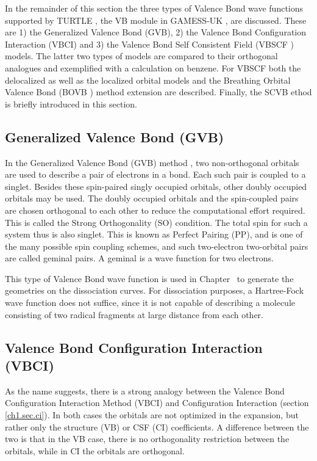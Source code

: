 In the remainder of this section the three types of Valence Bond wave functions supported by TURTLE \cite{turtle}, the VB module in GAMESS-UK \cite{gamess}, are discussed. These are 1) the Generalized Valence Bond (GVB), 2) the Valence Bond Configuration Interaction (VBCI) and 3) the Valence Bond Self Consistent Field (VBSCF \cite{vbscf1,vbscf2}) models. The latter two types of models are compared to their orthogonal analogues and exemplified with a calculation on benzene. For VBSCF both the delocalized as well as the localized orbital models and the Breathing Orbital Valence Bond (BOVB \cite{bovb1,bovb2,bovb3}) method extension are described. Finally, the SCVB ethod \cite{scvb1,scvb2,scvb3} is briefly introduced in this section.

\subsection{Generalized Valence Bond (GVB)}

In the Generalized Valence Bond (GVB) method \cite{jensen,gvb1,gvb2,gvb3,gvb4}, two non-orthogonal orbitals are used to describe a pair of electrons in a bond. Each such pair is coupled to a singlet. Besides these spin-paired singly occupied orbitals, other doubly occupied orbitals may be used. The doubly occupied orbitals and the spin-coupled pairs are chosen orthogonal to each other to reduce the computational effort required. This is called the Strong Orthogonality (SO) condition. The total spin for such a system thus is also singlet. This is known as Perfect Pairing (PP), and is one of the many possible spin coupling schemes, and such two-electron two-orbital pairs are called geminal pairs. A geminal is a wave function for two electrons. 

This type of Valence Bond wave function is used in Chapter \chdissociation\ to generate the geometries on the dissociation curves. For dissociation purposes, a Hartree-Fock wave function does not suffice, since it is not capable of describing a molecule consisting of two radical fragments at large distance from each other.

\subsection{Valence Bond Configuration Interaction (VBCI)}

As the name suggests, there is a strong analogy between the Valence Bond Configuration Interaction Method (VBCI) and Configuration Interaction (section \ref{ch1.sec.ci}). In both cases the orbitals are not optimized in the expansion, but rather only the structure (VB) or CSF (CI) coefficients. A difference between the two is that in the VB case, there is no orthogonality restriction between the orbitals, while in CI the orbitals are orthogonal.

